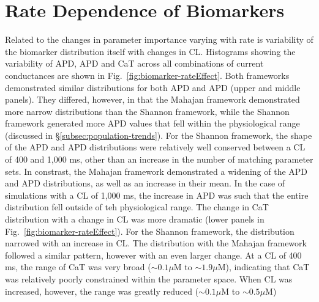 \documentclass[../thesis-main.tex]{subfiles}
\begin{document}
\section{Rate Dependence of Biomarkers}
\label{sec:biomarker-var}
Related to the changes in parameter importance varying with rate is variability of the biomarker distribution itself with changes in CL. Histograms showing the variability of APD, APD and CaT across all combinations of current conductances are shown in Fig.~\ref{fig:biomarker-rateEffect}. Both frameworks demonstrated similar distributions for both APD and APD (upper and middle panels). They differed, however, in that the Mahajan framework demonstrated more narrow distributions than the Shannon framework, while the Shannon framework generated more APD values that fell within the physiological range (discussed in \S\ref{subsec:population-trends}). For the Shannon framework, the shape of the APD and APD distributions were relatively well conserved between a CL of 400 and 1,000 ms, other than an increase in the number of matching parameter sets. In constrast, the Mahajan framework demonstrated a widening of the APD and APD distributions, as well as an increase in their mean. In the case of simulations with a CL of 1,000 ms, the increase in APD was such that the entire distribution fell outside of teh physiological range. The change in CaT distribution with a change in CL was more dramatic (lower panels in Fig.~\ref{fig:biomarker-rateEffect}). For the Shannon framework, the distribution narrowed with an increase in CL. The distribution with the Mahajan framework followed a similar pattern, however with an even larger change. At a CL of 400 ms, the range of CaT was very broad ($\sim0.1\mu$M to $\sim1.9\mu$M), indicating that CaT was relatively poorly constrained within the parameter space. When CL was increased, however, the range was greatly reduced ($\sim0.1\mu$M to $\sim0.5\mu$M)
\end{document}
